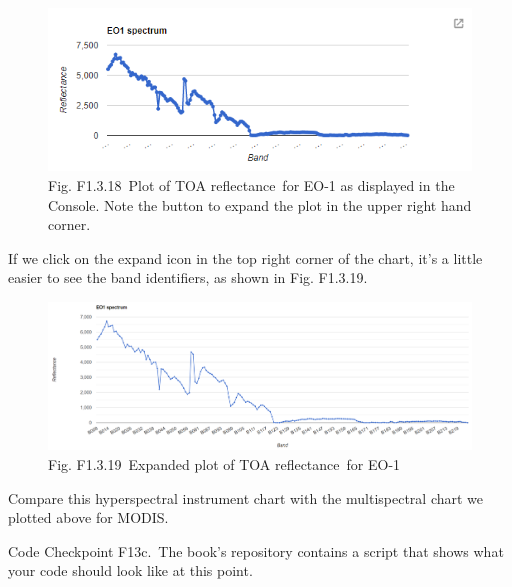 \documentclass[
  letterpaper,
  DIV=11,
  numbers=noendperiod]{scrreprt}
\begin{document}
\begin{figure}

{\centering \includegraphics{./F1/image23.png}

}

\caption{Fig. F1.3.18~Plot of TOA reflectance~for EO-1 as displayed in
the Console. Note the button to expand the plot in the upper right hand
corner.}

\end{figure}

If we click on the expand icon in the top right corner of the chart,
it's a little easier to see the band identifiers, as shown in Fig.
F1.3.19.~

\begin{figure}

{\centering \includegraphics{./F1/image70.png}

}

\caption{Fig. F1.3.19~Expanded plot of TOA reflectance~for EO-1}

\end{figure}

Compare this hyperspectral instrument chart with the multispectral chart
we plotted above for MODIS.

\begin{tcolorbox}[enhanced jigsaw, left=2mm, breakable, rightrule=.15mm, opacityback=0, colframe=quarto-callout-note-color-frame, colbacktitle=quarto-callout-note-color!10!white, arc=.35mm, opacitybacktitle=0.6, toptitle=1mm, colback=white, leftrule=.75mm, title=\textcolor{quarto-callout-note-color}{\faInfo}\hspace{0.5em}{Note}, toprule=.15mm, bottomtitle=1mm, titlerule=0mm, bottomrule=.15mm, coltitle=black]

Code Checkpoint F13c.~The book's repository contains a script that shows
what your code should look like at this point.

\end{tcolorbox}
\end{document}
